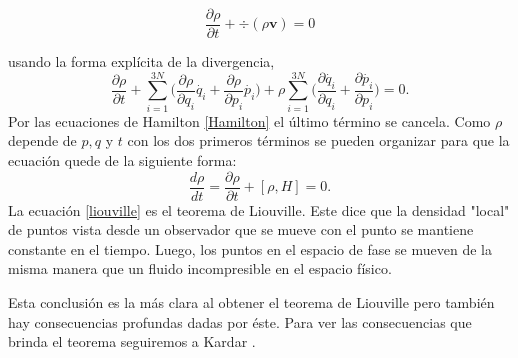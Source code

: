 \begin{equation} \label{con}
 \frac{\partial \rho}{\partial t} + \div{ ( \rho\mathbf{v} ) }=0
\end{equation}

usando la forma explícita de la divergencia,
\begin{equation}
 \frac{\partial \rho}{\partial t} +\sum_{i=1}^{3N} \Big( \frac{\partial\rho}{\partial q_{i}}\dot{q_{i}}+  \frac{\partial\rho}{\partial p_{i}}\dot{p_{i}} \Big) + \rho \sum_{i=1}^{3N} \Big( \frac{\partial \dot{q_{i}}}{\partial q_{i}} + \frac{\partial \dot{p_{i}}}{\partial p_{i}}\Big)=0.
\end{equation}
Por las ecuaciones de Hamilton \ref{Hamilton} el último término se cancela. Como $\rho$ depende de $p,q$ y $t$ con los dos primeros términos se pueden organizar para que la ecuación quede de la siguiente forma:
\begin{equation} \label{liouville}
\frac{d \rho}{dt}= \frac{\partial \rho}{\partial t} + [ \rho, H ]=0.
\end{equation}
La ecuación \ref{liouville} es el teorema de Liouville. Este dice que la densidad "local" de puntos vista desde un observador que se mueve con el punto se mantiene constante en el tiempo. Luego, los puntos en el espacio de fase se mueven de la misma manera que un fluido incompresible en el espacio físico.

Esta conclusión es la más clara al obtener el teorema de Liouville pero también hay consecuencias profundas dadas por éste. Para ver las consecuencias que brinda el teorema seguiremos a Kardar \cite{KardarStat}.

